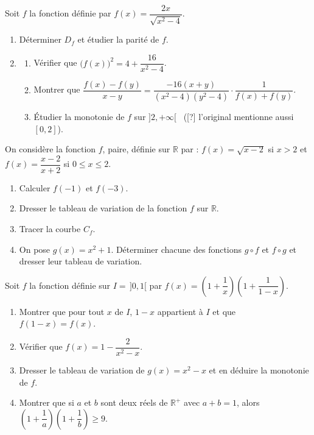 \fin
{}
Soit $f$ la fonction définie par $f(x)=\dfrac{2x}{\sqrt{x^2-4}}$.
\begin{enumerate}
\item Déterminer $D_f$ et étudier la parité de $f$.
\item \begin{enumerate}
\item Vérifier que $\big(f(x)\big)^2=4+\dfrac{16}{x^2-4}$.
\item Montrer que $\dfrac{f(x)-f(y)}{x-y}=\dfrac{-16(x+y)}{\left(x^2-4\right)\left(y^2-4\right)}\cdot\dfrac{1}{f(x)+f(y)}$.
\item Étudier la monotonie de $f$ sur $]2,+\infty[$ \ ([?] l'original mentionne aussi $[0,2]$).
\end{enumerate}
\end{enumerate}
\fin
{}
On considère la fonction $f$, paire, définie sur $\mathbb{R}$ par :
$f(x)=\sqrt{x-2}$ si $x>2$ \quad et \quad $f(x)=\dfrac{x-2}{x+2}$ si $0\leq x\leq2$.
\begin{enumerate}
\item Calculer $f(-1)$ et $f(-3)$.
\item Dresser le tableau de variation de la fonction $f$ sur $\mathbb{R}$.
\item Tracer la courbe $C_f$.
\item On pose $g(x)=x^2+1$. Déterminer chacune des fonctions $g\circ f$ et $f\circ g$ et dresser leur tableau de variation.
\end{enumerate}
\fin
{}
Soit $f$ la fonction définie sur $I=\,]0,1[$ par $f(x)=\left(1+\dfrac1x\right)\left(1+\dfrac{1}{1-x}\right)$.
\begin{enumerate}
\item Montrer que pour tout $x$ de $I$, $1-x$ appartient à $I$ et que $f(1-x)=f(x)$.
\item Vérifier que $f(x)=1-\dfrac{2}{x^2-x}$.
\item Dresser le tableau de variation de $g(x)=x^2-x$ et en déduire la monotonie de $f$.
\item Montrer que si $a$ et $b$ sont deux réels de $\mathbb{R}^+$ avec $a+b=1$, alors $\left(1+\dfrac1a\right)\left(1+\dfrac1b\right)\geq9$.
\end{enumerate}
\fin
